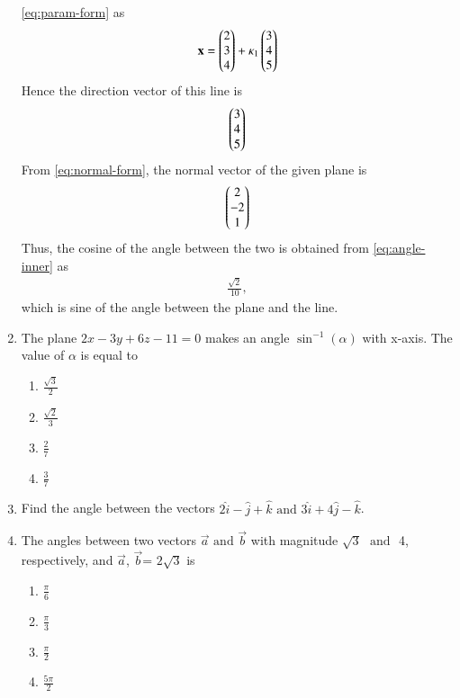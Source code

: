 \begin{enumerate}[label=\thesubsection.\arabic*, ref=\thesubsection.\theenumi]
	\eqref{eq:param-form}
	as
\begin{align}
	\mathbf{x} = \begin{pmatrix}2 \\ 3 \\ 4\end{pmatrix} + \kappa_1 \begin{pmatrix}3 \\ 4 \\ 5\end{pmatrix}
\end{align}
Hence the direction vector of this line is 
\begin{align}
\begin{pmatrix}3 \\ 4 \\ 5\end{pmatrix}
\end{align}
	From \eqref{eq:normal-form},  the normal vector of the given plane is 
\begin{align}
\begin{pmatrix}2 \\ -2 \\ 1\end{pmatrix}
\end{align}
Thus,  the cosine of the angle between the two is 
obtained from \eqref{eq:angle-inner} as
\begin{align}
	\frac{\sqrt{2}}{10}, 
\end{align}
which is sine of the angle between the plane and the line.
\item The plane $2x-3y+6z-11=0$ makes an angle $\sin^{-1}(\alpha)$ with x-axis. The value of $\alpha$ is equal to 
\begin{enumerate}
	\item  $\frac{\sqrt{3}}{2}$
	\item  $\frac{\sqrt{2}}{3}$
	\item  $\frac{2}{7}$
	\item  $\frac{3}{7}$
\end{enumerate}
\item Find the angle between the vectors $2\hat{i}-\hat{j}+\hat{k}$ $\text{and}$ $3\hat{i}+4\hat{j}-\hat{k}$.
\item The angles between two vectors $\vec{a}$ $\text{and}$ $\vec{b}$ with magnitude $\sqrt{3}$ $\text{ and }$ 4,  respectively,  and $\vec{a}$,  $\vec{b}$= $2\sqrt{3}$ is
	\begin{enumerate}
\item $\frac{\pi}{6}$
\item $\frac{\pi}{3}$
\item $\frac{\pi}{2}$ 
\item $\frac{5\pi}{2}$
\end{enumerate}


\end{enumerate}

